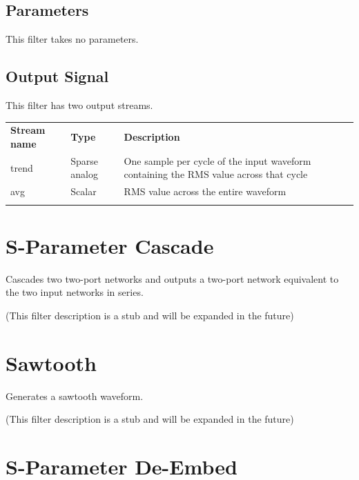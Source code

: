 \subsection{Parameters}

This filter takes no parameters.

\subsection{Output Signal}

This filter has two output streams.

\begin{tabularx}{16cm}{llX}
\thickhline
\textbf{Stream name} & \textbf{Type} & \textbf{Description} \\
\thickhline
trend & Sparse analog & One sample per cycle of the input waveform containing the RMS value across that cycle \\
\thinhline
avg & Scalar & RMS value across the entire waveform \\
\thickhline
\end{tabularx}

\pagebreak
\section{S-Parameter Cascade}
\label{filter:sparamcascade}

Cascades two two-port networks and outputs a two-port network equivalent to the two input networks in series.

(This filter description is a stub and will be expanded in the future)

\pagebreak
\section{Sawtooth}

Generates a sawtooth waveform.

(This filter description is a stub and will be expanded in the future)

\pagebreak
\section{S-Parameter De-Embed}

